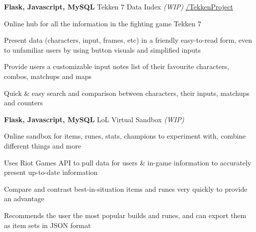 
\begin{cventries}

  \cventry
    {\textbf{Flask, Javascript, MySQL}} %
    {Tekken 7 Data Index \textit{(WIP)}} %
    {\href{https://github.com/basulaib/TekkenProject}{\faGithub /TekkenProject}} %
    {} %
    {
      \begin{cvitems} %
        \item {Online hub for all the information in the fighting game Tekken 7}
        \item {Present data (characters, input, frames, etc) in a friendly easy-to-read form, even to unfamiliar users by using button visuals and simplified inputs}
        \item {Provide users a customizable input notes list of their favourite characters, combos, matchups and maps}
        \item {Quick \& easy search and comparison between characters, their inputs, matchups and counters}
      \end{cvitems}
    }
    
  \cventry
    {\textbf{Flask, Javascript, MySQL}} %
    {LoL Virtual Sandbox \textit{(WIP)}} %
    {} %
    {} %
    {
      \begin{cvitems} %
        \item {Online sandbox for items, runes, stats, champions to experiment with, combine different things and more}
        \item {Uses Riot Games API to pull data for users \& in-game information to accurately present up-to-date information}
        \item {Compare and contrast best-in-situation items and runes very quickly to provide an advantage}
        \item {Recommends the user the most popular builds and runes, and can export them as item sets in JSON format}
      \end{cvitems}
    }


\end{cventries}
